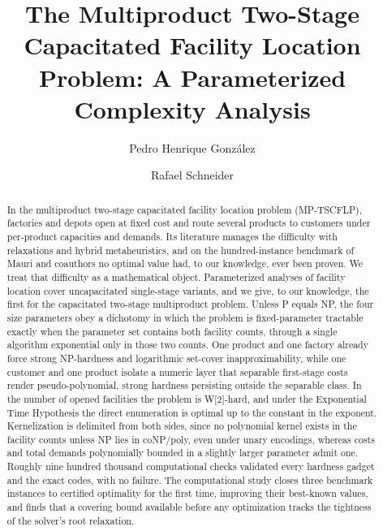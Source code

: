 \documentclass[a4paper,fleqn]{cas-sc}
\theoremstyle{definition}
\theoremstyle{remark}
\begin{document}
\let\WriteBookmarks\relax
\def\floatpagepagefraction{1}
\def\textpagefraction{.001}


\title[mode = title]{The Multiproduct Two-Stage Capacitated Facility
Location Problem: A Parameterized Complexity Analysis}

\author[1]{Pedro Henrique Gonz\'alez}
\cormark[1]

\author[1]{Rafael Schneider}



\begin{abstract}
In the multiproduct two-stage capacitated facility location problem
(MP-TSCFLP), factories and depots open at fixed cost and route several
products to customers under per-product capacities and demands. Its
literature manages the difficulty with relaxations and hybrid
metaheuristics, and on the hundred-instance benchmark of Mauri and
coauthors no optimal value had, to our knowledge, ever been proven. We treat that
difficulty as a mathematical object. Parameterized analyses of
facility location cover uncapacitated single-stage variants, and we
give, to our knowledge, the first for the capacitated two-stage
multiproduct problem. Unless P equals NP, the four size parameters
obey a dichotomy in which the problem is fixed-parameter tractable
exactly when the parameter set contains both facility counts, through
a single algorithm exponential only in those two counts. One product
and one factory already force strong NP-hardness and logarithmic
set-cover inapproximability, while one customer and one product
isolate a numeric layer that separable first-stage costs render
pseudo-polynomial, strong hardness persisting outside the separable
class. In the number of opened facilities the problem is W[2]-hard,
and under the Exponential Time Hypothesis the direct enumeration is
optimal up to the constant in the exponent. Kernelization is delimited
from both sides, since no polynomial kernel exists in the facility
counts unless NP lies in coNP/poly, even under unary encodings,
whereas costs and total demands polynomially bounded in a slightly
larger parameter admit one. Roughly nine hundred thousand
computational checks validated every hardness gadget and the exact
codes, with no failure. The computational study closes three benchmark
instances to certified optimality for the first time, improving their
best-known values, and finds that a covering bound available before
any optimization tracks the tightness of the solver's root relaxation.
\end{abstract}
\end{document}
